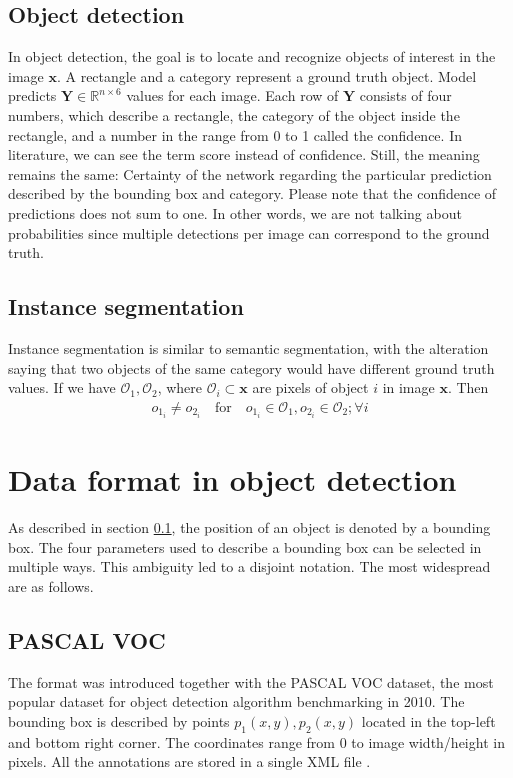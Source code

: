 \subsection{Object detection}
\label{subsec:object_detection}
In object detection, the goal is to locate and recognize objects of interest in the image $\mathbf{x}$. A rectangle and a category represent a ground truth object. Model predicts $\mathbf{Y} \in \mathbb{R}^{n \times 6}$ values for each image. Each row of $\mathbf{Y}$ consists of four numbers, which describe a rectangle, the category of the object inside the rectangle, and a number in the range from 0 to 1 called the confidence. In literature, we can see the term score instead of confidence. Still, the meaning remains the same: Certainty of the network regarding the particular prediction described by the bounding box and category. Please note that the confidence of predictions does not sum to one. In other words, we are not talking about probabilities since multiple detections per image can correspond to the ground truth.

\subsection{Instance segmentation}
Instance segmentation is similar to semantic segmentation, with the alteration saying that two objects of the same category would have different ground truth values. If we have $\mathcal{O}_1, \mathcal{O}_2$, where $\mathcal{O}_i \subset \mathbf{x}$ are pixels of object $i$ in image $\mathbf{x}$. Then
\begin{align}
    o_{1_i} \neq o_{2_i} \quad \text{for} \quad o_{1_i} \in \mathcal{O}_1, o_{2_i} \in \mathcal{O}_2;\forall i
\end{align}

\section{Data format in object detection}
As described in section \ref{subsec:object_detection}, the position of an object is denoted by a bounding box.  The four parameters used to describe a bounding box can be selected in multiple ways. This ambiguity led to a disjoint notation. The most widespread are as follows.
\subsection{PASCAL VOC}
The format was introduced together with the PASCAL VOC dataset, the most popular dataset for object detection algorithm benchmarking in 2010. The bounding box is described by points $p_1(x,y),p_2(x,y)$ located in the top-left and bottom right corner. The coordinates range from 0 to image width/height in pixels. All the annotations are stored in a single XML file \cite{Everingham2009,Padilla2021}.
